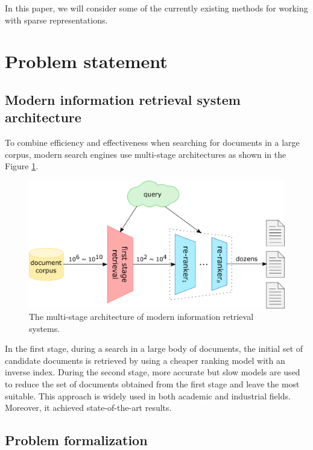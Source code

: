 \documentclass[
    twocolumn,
]{ceurart}
\begin{document}
    In this paper, we will consider some of the currently existing methods for working with sparse
    representations.


    \section{Problem statement}

    \subsection{Modern information retrieval system architecture}

    To combine efficiency and effectiveness when searching for documents in a large corpus, modern
    search engines use multi-stage architectures as shown in the Figure \ref{fig:architecture}.
    \begin{figure}[h]
        \centering
        \includegraphics[width=\linewidth]{Architecture.png}
        \caption{The multi-stage architecture of modern information retrieval systems.}
        \label{fig:architecture}
    \end{figure}

    In the first stage, during a search in a large body of documents, the initial set of candidate
    documents is retrieved by using a cheaper ranking model with an inverse index.
    During the second stage, more accurate but slow models are used to reduce the set of
    documents obtained from the first stage and leave the most suitable.
    This approach is widely used in both academic and industrial fields.
    Moreover, it achieved state-of-the-art results.

    \subsection{Problem formalization} \label{problem-formalization}
\end{document}
